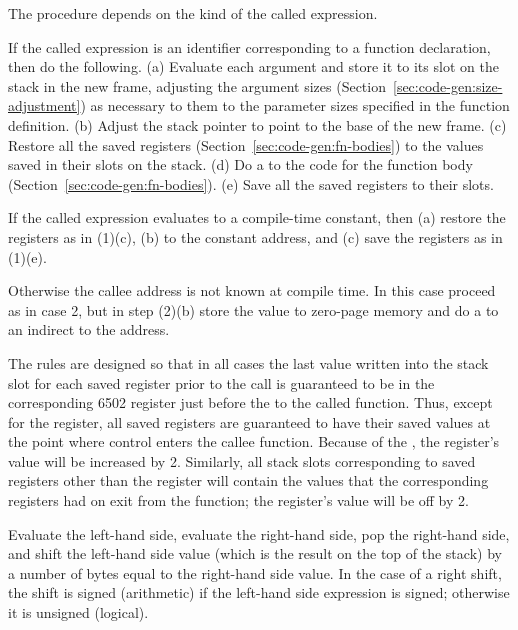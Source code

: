 \documentclass[10pt]{article}
\begin{document}
 The procedure depends on the kind of the
called expression.

 If the called expression is an
identifier corresponding to a function declaration, then do the
following.  (a) Evaluate each argument and store it to its slot on the
stack in the new frame, adjusting the argument sizes
(Section~\ref{sec:code-gen:size-adjustment}) as necessary to them to
the parameter sizes specified in the function definition. (b) Adjust
the stack pointer to point to the base of the new frame.  (c) Restore
all the saved registers (Section~\ref{sec:code-gen:fn-bodies}) to the
values saved in their slots on the stack.  (d) Do a  to the
code for the function body (Section~\ref{sec:code-gen:fn-bodies}). (e)
Save all the saved registers to their slots.

 If the called expression
evaluates to a compile-time constant, then (a) restore the registers
as in (1)(c), (b)  to the constant address, and (c) save the
registers as in (1)(e).

 Otherwise the callee address is
not known at compile time.  In this case proceed as in case 2, but in
step (2)(b) store the value to zero-page memory and do a  to
an indirect  to the address.

The rules are designed so that in all cases the last value written
into the stack slot for each saved register prior to the call is
guaranteed to be in the corresponding 6502 register just before the
 to the called function.  Thus, except for the 
register, all saved registers are guaranteed to have their saved
values at the point where control enters the callee function.  Because
of the , the  register's value will be increased by 2.
Similarly, all stack slots corresponding to saved registers other than
the  register will contain the values that the corresponding
registers had on exit from the function; the  register's value
will be off by 2.

%
 Evaluate the left-hand side,
evaluate the right-hand side, pop the right-hand side, and shift the
left-hand side value (which is the result on the top of the stack) by
a number of bytes equal to the right-hand side value.  In the case of
a right shift, the shift is signed (arithmetic) if the left-hand side
expression is signed; otherwise it is unsigned (logical).
\end{document}

